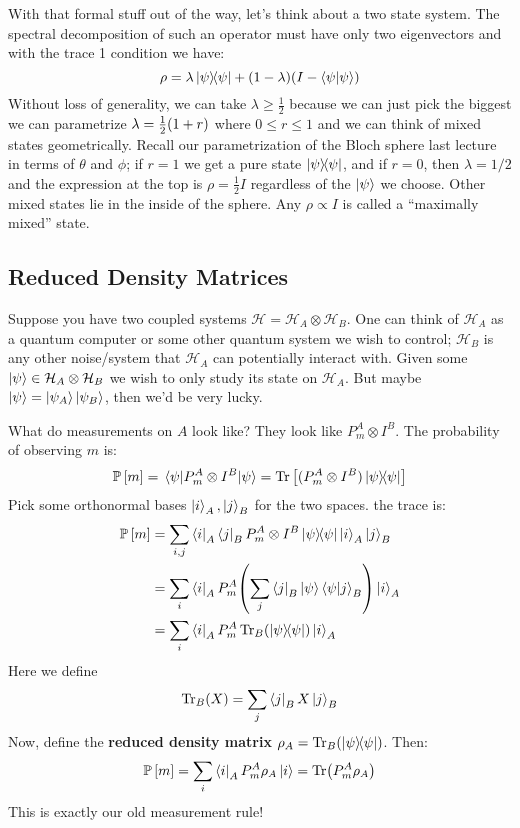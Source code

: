 With that formal stuff out of the way, let's think about a two state system. The spectral decomposition
of such an operator must have only two eigenvectors and with the trace 1 condition we have:
\[ \rho = \lambda \ketbra{\psi}{\psi} + (1 - \lambda)(I - \braket{\psi}{\psi}) \]
Without loss of generality, we can take $\lambda \geq \frac{1}{2}$ because we can just pick the biggest
we can parametrize $\lambda = \frac{1}{2} \qty(1 + r)$ where $0 \leq r \leq 1$ and we can think of
mixed states geometrically. Recall our parametrization of the Bloch sphere last lecture in terms of $\theta$ and $\phi$;
if $r = 1$ we get a pure state $\ketbra{\psi}{\psi}$, and if $r = 0$, then $\lambda = 1/2$ and the expression at the top is $\rho = \frac{1}{2} I$
regardless of the $\ket{\psi}$ we choose. Other mixed states lie in the inside of the sphere. Any $\rho \propto I$ is called a
``maximally mixed'' state.

\subsection{Reduced Density Matrices}
Suppose you have two coupled systems $\mathcal{H} = \mathcal{H}_A \otimes \mathcal{H}_B$. One can think
of $\mathcal{H}_A$ as a quantum computer or some other quantum system we wish to control; $\mathcal{H}_B$ is any other
noise/system that $\mathcal{H}_A$ can potentially interact with. Given some $\ket{\psi} \in \mathcal{H}_A \otimes \mathcal{H}_B$
we wish to only study its state on $\mathcal{H}_A$. But maybe $\ket{\psi} = \ket{\psi_A} \ket{\psi_B}$, then we'd be very lucky.

What do measurements on $A$ look like? They look like $P_m^{A} \otimes I^B$. The probability of observing $m$ is:
\[ \mathbb{P}\left[ m \right] = \mel{\psi}{P_m^A \otimes I^B}{\psi} = \Tr\qty[(P_m^A \otimes I^B) \ketbra{\psi}{\psi}] \]
Pick some orthonormal bases $\ket{i}_A, \ket{j}_B$ for the two spaces. the trace is:
\begin{align*}
    \mathbb{P}\left[ m \right] &= \sum_{i, j} \bra{i}_A \bra{j}_B P_m^A \otimes I^B \ketbra{\psi}{\psi} \ket{i}_A \ket{j}_B \\
    &= \sum_{i} \bra{i}_A P_m^A \qty(\sum_j \bra{j}_B\ket{\psi} \bra{\psi} \ket{j}_B) \ket{i}_A \\
    &= \sum_{i} \bra{i}_A P_m^A \Tr_B(\ketbra{\psi}{\psi}) \ket{i}_A \\
\end{align*}
Here we define 
\[ \Tr_B(X) = \sum_j \bra{j}_B X \ket{j}_B \]
Now, define the \textbf{reduced density matrix} $\rho_A = \Tr_B(\ketbra{\psi}{\psi})$. Then:
\[ \mathbb{P}\left[ m \right] = \sum_i \bra{i}_A P_m^A \rho_A \ket{i} = \Tr(P_m^A \rho_A) \]
This is exactly our old measurement rule!

